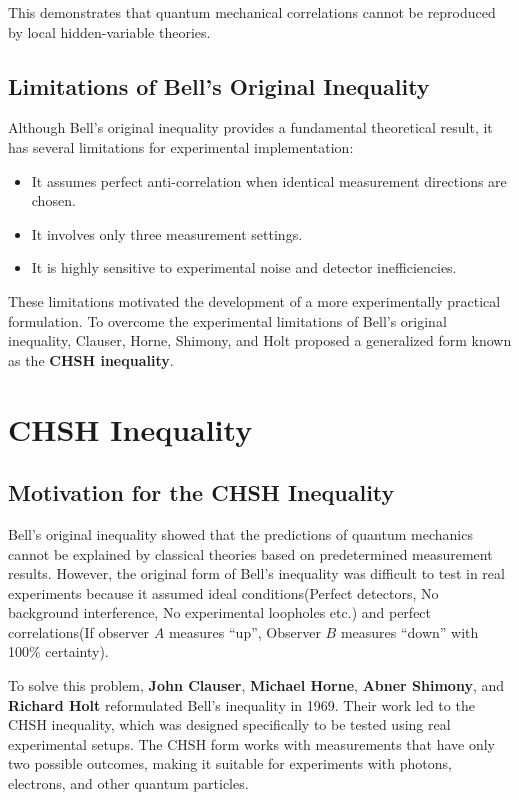 \documentclass[17pt,a4paper]{extarticle}
\begin{document}
This demonstrates that quantum mechanical correlations cannot be reproduced by local hidden-variable theories.


\subsection{Limitations of Bell's Original Inequality}

Although Bell’s original inequality provides a fundamental theoretical result, it has several limitations for experimental implementation:

\begin{itemize}
\item It assumes perfect anti-correlation when identical measurement directions are chosen.
\item It involves only three measurement settings.
\item It is highly sensitive to experimental noise and detector inefficiencies.
\end{itemize}

These limitations motivated the development of a more experimentally practical formulation. To overcome the experimental limitations of Bell’s original inequality, Clauser, Horne, Shimony, and Holt proposed a generalized form known as the \textbf{CHSH inequality}.

\section{CHSH Inequality}
\subsection{Motivation for the CHSH Inequality}
Bell’s original inequality showed that the predictions of quantum mechanics cannot be explained by classical theories based on predetermined measurement results. However, the original form of Bell’s inequality was difficult to test in real experiments because it assumed ideal conditions(Perfect detectors, No background interference, No experimental loopholes etc.) and perfect correlations(If observer $A$ measures “up”, Observer $B$ measures “down” with 100\% certainty).

To solve this problem, \textbf{John Clauser}, \textbf{Michael Horne}, \textbf{Abner Shimony}, and \textbf{Richard Holt} reformulated Bell’s inequality in 1969. Their work led to the CHSH inequality, which was designed specifically to be tested using real experimental setups. The CHSH form works with measurements that have only two possible outcomes, making it suitable for experiments with photons, electrons, and other quantum particles.
\end{document}
